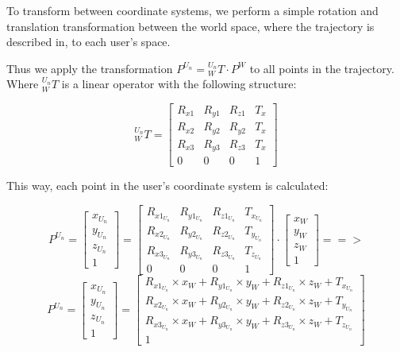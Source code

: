 \documentclass[a4paper,11pt,times,doublespace]{article}
\begin{document}
To transform between coordinate systems, we perform a simple rotation and translation transformation between the world space, where the trajectory is described in, to each user's space.

Thus we apply the transformation $P^{U_n} = {}_W^{U_n}T \cdot P^W$ to all points in the trajectory. Where ${}_W^{U_n}T$ is a linear operator with the following structure:
	
	\begin{equation*}
		{}_W^{U_n}T = \begin{bmatrix}
			R_{x1} & R_{y1} & R_{z1} & T_x\\	
			R_{x2} & R_{y2} & R_{y2} & T_x\\
			R_{x3} & R_{y3} & R_{z3} & T_x\\
			0 & 0 & 0 & 1
		\end{bmatrix}
	\end{equation*}
	
This way, each point in the user's coordinate system is calculated:
	
	\begin{equation*}
		P^{U_n} = \begin{bmatrix} x_{U_n} \\ y_{U_n} \\ z_{U_n} \\ 1 \end{bmatrix} = 
		\begin{bmatrix}
		R_{x1_{U_n}} & R_{y1_{U_n}} & R_{z1_{U_n}} & T_{x_{U_n}}\\	
		R_{x2_{U_n}} & R_{y2_{U_n}} & R_{z2_{U_n}} & T_{y_{U_n}}\\
		R_{x3_{U_n}} & R_{y3_{U_n}} & R_{z3_{U_n}} & T_{z_{U_n}}\\
		0 & 0 & 0 & 1
		\end{bmatrix} \cdot
		\begin{bmatrix} x_W \\ y_W \\ z_W \\ 1 \end{bmatrix} ==>
	\end{equation*}
	\begin{equation*}
		P^{U_n} = \begin{bmatrix} x_{U_n} \\ y_{U_n} \\ z_{U_n} \\ 1 \end{bmatrix} = 
		\begin{bmatrix}
			R_{x1_{U_n}} \times x_W + R_{y1_{U_n}} \times y_W + R_{z1_{U_n}} \times z_W + T_{x_{U_n}}\\
			R_{x2_{U_n}} \times x_W + R_{y2_{U_n}} \times y_W + R_{z2_{U_n}} \times z_W + T_{y_{U_n}}\\
			R_{x3_{U_n}} \times x_W + R_{y3_{U_n}} \times y_W + R_{z3_{U_n}} \times z_W + T_{z_{U_n}}\\
			1
		\end{bmatrix}
	\end{equation*}
\end{document}

